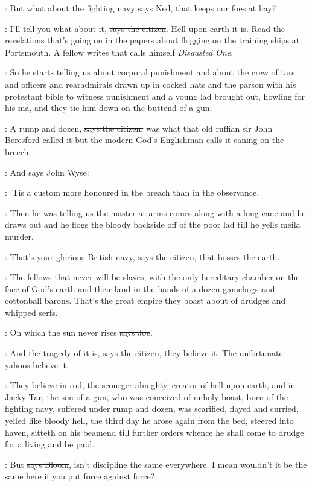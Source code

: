 \lambert:
But what about the fighting navy \sout{says Ned},
that keeps our foes at bay?

\citizen:
I'll tell you what about it, \sout{says the citizen}.
Hell upon earth it is.
Read the revelations that's going on in the papers about flogging on the
training ships at Portsmouth. A fellow writes that calls himself \emph{Disgusted
One}.

\Nq:
So he starts telling us about corporal punishment and about the crew
of tars and officers and rearadmirals drawn up in cocked hats and the
parson with his protestant bible to witness punishment and a young lad
brought out, howling for his ma, and they tie him down on the buttend of a
gun.

\citizen:
A rump and dozen, \sout{says the citizen,}
was what that old ruffian sir John
Beresford called it but the modern God's Englishman calls it caning on the
breech.

\Nq:
And says John Wyse:

\johnwyse:
'Tis a custom more honoured in the breach
than in the observance.

\Nq:
Then he was telling us the master at arms comes along with a long
cane and he draws out and he flogs the bloody backside off of the poor lad
till he yells meila murder.

\citizen:
That's your glorious British navy,
\sout{says the citizen,}
that bosses the earth.

\citizen:
The fellows that never will be slaves,
with the only hereditary chamber on
the face of God's earth and their land in the hands of a dozen gamehogs
and cottonball barons. That's the great empire they boast about of drudges
and whipped serfs.

\joe:
On which the sun never rises \sout{says Joe}.

\citizen:
And the tragedy of it is, \sout{says the citizen,}
they believe it. The
unfortunate yahoos believe it.

:
They believe in rod, the scourger almighty, creator of hell upon earth,
and in Jacky Tar, the son of a gun, who was conceived of unholy boast,
born of the fighting navy, suffered under rump and dozen, was scarified,
flayed and curried, yelled like bloody hell, the third day he arose again
from the bed, steered into haven, sitteth on his beamend till further
orders whence he shall come to drudge for a living and be paid.

\Bloom:
But \sout{says Bloom},
isn't discipline the same everywhere. I mean wouldn't
it be the same here if you put force against force?

